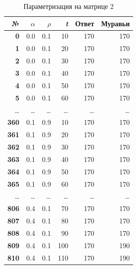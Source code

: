 \documentclass[a4paper,12pt]{article}
\begin{document}
\begin{table} [h!]
\begin{center}
\caption{Параметризация на матрице 2}
\begin{tabular}{|r|r|r|r|r|r|}
\hline
   {\bf №} & {\bf $\alpha$} &  {\bf $\rho$} &    {\bf \textit{t}} & {\bf Ответ} & {\bf Муравьи} \\
\hline
   {\bf 0} &        0.0 &        0.1 &       10 &        170 &        170 \\
\hline
   {\bf 1} &        0.0 &        0.1 &       20 &        170 &        170 \\
\hline
   {\bf 2} &        0.0 &        0.1 &       30 &        170 &        170 \\
\hline
   {\bf 3} &        0.0 &        0.1 &       40 &        170 &        170 \\
\hline
   {\bf 4} &        0.0 &        0.1 &       50 &        170 &        170 \\
\hline
   {\bf 5} &        0.0 &        0.1 &       60 &        170 &        170 \\
\hline
\ldots & \ldots & \ldots & \ldots & \ldots & \ldots\\
\hline
 {\bf 360} &        0.1 &        0.9 &       10 &        170 &        170 \\
\hline
 {\bf 361} &        0.1 &        0.9 &       20 &        170 &        170 \\
\hline
 {\bf 362} &        0.1 &        0.9 &       30 &        170 &        170 \\
\hline
 {\bf 363} &        0.1 &        0.9 &       40 &        170 &        170 \\
\hline
 {\bf 364} &        0.1 &        0.9 &       50 &        170 &        170 \\
\hline
 {\bf 365} &        0.1 &        0.9 &       60 &        170 &        170 \\
\hline
\ldots & \ldots & \ldots & \ldots & \ldots & \ldots\\
\hline
 {\bf 806} &        0.4 &        0.1 &       70 &        170 &        170 \\
\hline
 {\bf 807} &        0.4 &        0.1 &       80 &        170 &        170 \\
\hline
 {\bf 808} &        0.4 &        0.1 &       90 &        170 &        170 \\
\hline
 {\bf 809} &        0.4 &        0.1 &      100 &        170 &        190 \\
\hline
 {\bf 810} &        0.4 &        0.1 &      110 &        170 &        190 \\

\end{tabular}
\end{center}
\end{table}
\end{document}
